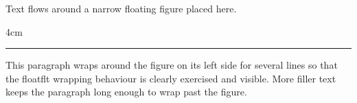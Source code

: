 \documentclass{article}
\begin{document}
Text flows around a narrow floating figure placed here.
\begin{floatingfigure}[r]{4cm}
\rule{3.6cm}{2cm}
\caption{A small black box}
\end{floatingfigure}
This paragraph wraps around the figure on its left side for several lines
so that the floatflt wrapping behaviour is clearly exercised and visible.
More filler text keeps the paragraph long enough to wrap past the figure.
\end{document}
